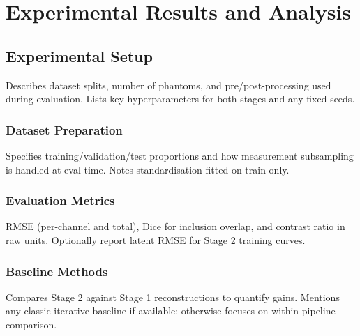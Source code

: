 
\chapter{Experimental Results and Analysis}

\section{Experimental Setup}

Describes dataset splits, number of phantoms, and pre/post-processing used during evaluation. Lists key hyperparameters for both stages and any fixed seeds.


\subsection{Dataset Preparation}

Specifies training/validation/test proportions and how measurement subsampling is handled at eval time. Notes standardisation fitted on train only.


\subsection{Evaluation Metrics}

RMSE (per-channel and total), Dice for inclusion overlap, and contrast ratio in raw units. Optionally report latent RMSE for Stage 2 training curves.


\subsection{Baseline Methods}

Compares Stage 2 against Stage 1 reconstructions to quantify gains. Mentions any classic iterative baseline if available; otherwise focuses on within-pipeline comparison.


